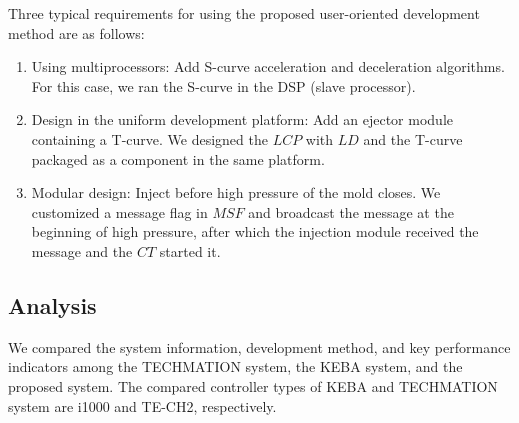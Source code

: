 \documentclass[journal,UTF8]{IEEEtran}
\begin{document}
	Three typical requirements for using the proposed user-oriented development method are as follows:
	\begin{enumerate}
		\item Using multiprocessors: Add S-curve acceleration and deceleration algorithms. For this case, we ran the S-curve in the DSP (slave processor).
		\item Design in the uniform development platform: Add an ejector module containing a T-curve. We designed the $LCP$ with $LD$ and the T-curve packaged as a component in the same platform.
		\item Modular design: Inject before high pressure of the mold closes. We customized a message flag in $MSF$ and broadcast the message at the beginning of high pressure, after which the injection module received the message and the $CT$ started it.
	\end{enumerate}
	\subsection{Analysis}
	We compared the system information, development method, and key performance indicators among the TECHMATION system, the KEBA system, and the proposed system. The compared controller types of KEBA and TECHMATION system are i1000 and TE-CH2, respectively. 
	
\end{document}
